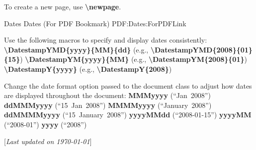 \documentclass[letterpaper,MMMyyyy,nonstopmode]{simpleresumecv}
\newcommand{\CVNote}{Last updated on {\today}}
\newcommand{\Code}[1]{\mbox{\textbf{#1}}}
\newcommand{\CodeCommand}[1]{\mbox{\textbf{\textbackslash{#1}}}}
\begin{document}
\begin{Body}
\Gap
\BulletItem
To create a new page, use \CodeCommand{newpage}.

\BigGap
\SubSection
{Dates}
{Dates (For PDF Bookmark)}
{PDF:Dates:ForPDFLink}

\BigGap
\BulletItem
Use the following macros to specify and display dates consistently:
\SubBulletItem
\CodeCommand{DatestampYMD\{yyyy\}\{MM\}\{dd\}}
(e.g., \CodeCommand{DatestampYMD\{2008\}\{01\}\{15\}})
\SubBulletItem
\CodeCommand{DatestampYM\{yyyy\}\{MM\}}
(e.g., \CodeCommand{DatestampYM\{2008\}\{01\}})
\SubBulletItem
\CodeCommand{DatestampY\{yyyy\}}
(e.g., \CodeCommand{DatestampY\{2008\}})

\Gap
\BulletItem
Change the date format option passed to the document class to adjust how dates are displayed throughout the document:
\SubBulletItem
\Code{MMMyyyy} (``Jan~2008'')
\SubBulletItem
\Code{ddMMMyyyy} (``15~Jan~2008'')
\SubBulletItem
\Code{MMMMyyyy} (``January~2008'')
\SubBulletItem
\Code{ddMMMMyyyy} (``15~January~2008'')
\SubBulletItem
\Code{yyyyMMdd} (``2008-01-15'')
\SubBulletItem
\Code{yyyyMM} (``2008-01'')
\SubBulletItem
\Code{yyyy} (``2008'')

\endgroup

\fi

\end{Body}


\BigGap
\UseNoteFont%
\null\hfill%
[\textit{\CVNote}]
\end{document}
